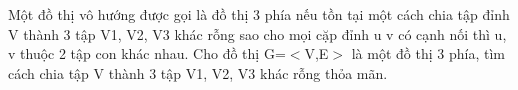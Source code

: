 Một đồ thị vô hướng được gọi là đồ thị 3 phía nếu tồn tại một cách chia tập đỉnh V thành 3 tập V1, V2, V3 khác rỗng sao cho mọi cặp đỉnh u v có cạnh nối thì u, v thuộc 2 tập con khác nhau. Cho đồ thị G=$<$V,E$>$ là một đồ thị 3 phía, tìm cách chia tập V thành 3 tập V1, V2, V3 khác rỗng thỏa mãn.  

\